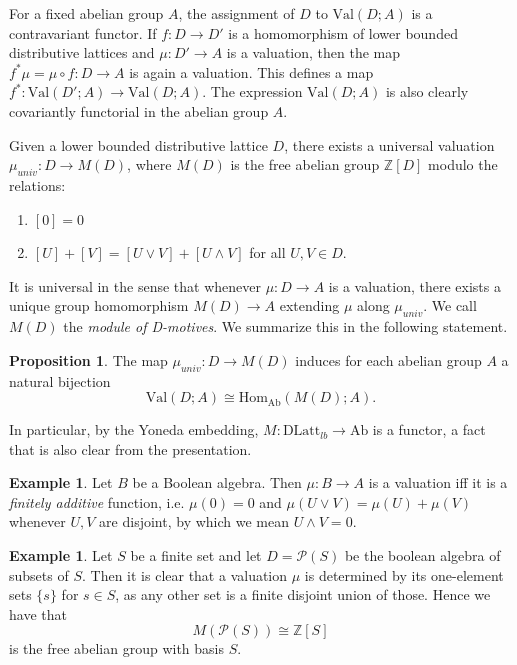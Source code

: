\documentclass[10pt]{amsart}
\theoremstyle{definition}
\newtheorem{proposition}[theorem]{Proposition}
\newtheorem{example}[theorem]{Example}
\begin{document}
For a fixed abelian group $A$, the assignment of $D$ to $\mathrm{Val}(D;A)$ is a contravariant functor. If $f : D \rightarrow D'$ is a homomorphism of lower bounded distributive lattices and $\mu : D' \rightarrow A$ is a valuation, then the map $f^* \mu = \mu \circ  f  : D \rightarrow A$ is again a valuation. This defines a map $f^* : \mathrm{Val}(D';A) \rightarrow \mathrm{Val}(D;A)$. The expression $\mathrm{Val}(D;A)$ is also clearly covariantly functorial in the abelian group $A$.

Given a lower bounded distributive lattice $D$, there exists a universal valuation $\mu_{univ} : D \rightarrow M(D)$, where $M(D)$ is the free abelian group $\mathbb{Z}[D]$ modulo the relations:
\begin{enumerate}
\item $[0] = 0$
\item $[U] + [V] = [U \vee V] + [U \wedge V]$ for all $U, V \in D$.
\end{enumerate}
It is universal in the sense that whenever $\mu : D \rightarrow A$ is a valuation, there exists a unique group homomorphism $M(D) \rightarrow A$ extending $\mu$ along $\mu_{univ}$. We call $M(D)$ the \emph{module of D-motives}. We summarize this in the following statement.

\begin{proposition}
The map $\mu_{univ} : D \rightarrow M(D)$ induces for each abelian group $A$ a natural bijection
$$\mathrm{Val}(D; A) \cong \mathrm{Hom}_{\mathrm{Ab}}( M(D); A ).$$
\end{proposition}

In particular, by the Yoneda embedding, $M : \mathrm{DLatt}_{lb} \rightarrow \mathrm{Ab}$ is a functor, a fact that is also clear from the presentation.

\begin{example}
Let $B$ be a Boolean algebra. Then $\mu : B \rightarrow A$ is a valuation iff it is a \emph{finitely additive} function, i.e. $\mu(0) = 0$ and $\mu(U \vee V) = \mu(U) + \mu(V)$ whenever $U,V$ are disjoint, by which we mean $U \wedge V = 0$.
\end{example}

\begin{example} \label{finiteset}
Let $S$ be a finite set and let $D = \mathcal{P}(S)$ be the boolean algebra of subsets of $S$. Then it is clear that a valuation $\mu$ is determined by its one-element sets $\{s\}$ for $s \in S$, as any other set is a finite disjoint union of those. Hence we have that
$$M(\mathcal{P}(S)) \cong \mathbb{Z}[S]$$
is the free abelian group with basis $S$.
\end{example}
\end{document}

